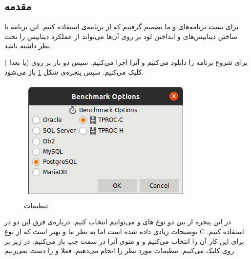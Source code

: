 \subsection{مقدمه}
برای تست برنامه‌های
 و 
ما تصمیم گرفتیم که از برنامه‌ی
استفاده کنیم. این برنامه با ساختن دیتابیس‌های
و انداختن لود بر روی آن‌ها می‌تواند از عملکرد دیتابیس را تحت نظر داشته باشد.

برای شروع برنامه را دانلود می‌کنیم و آنرا اجرا می‌کنیم. سپس دو بار بر روی
 (یا بعدا )
کلیک می‌کنیم. سپس پنجره‌ی شکل
\ref{fig:hammerdb:init:benchmark_options}
باز می‌شود.
\begin{figure}[H]
    \centering
    \includegraphics[scale=1]{pictures/hammerdb/benchmark-options.png}
    \caption{تنظیمات }
    \label{fig:hammerdb:init:benchmark_options}
\end{figure}
در این پنجره از بین دو نوع
های
 و 
می‌توانیم انتخاب کنیم. درباره‌ی فرق این دو در
توضیحات زیادی داده شده است اما به نظر ما و
بهتر است که از نوع
C
استفاده کنیم. برای این کار آن را انتخاب می‌کنیم و و منوی آنرا در سمت چپ باز می‌کنیم.
در زیر
بر روی
کلیک می‌کنیم. تنظیمات مورد نظر را انجام می‌دهیم. فعلا
و
را دست نمی‌زنیم.
